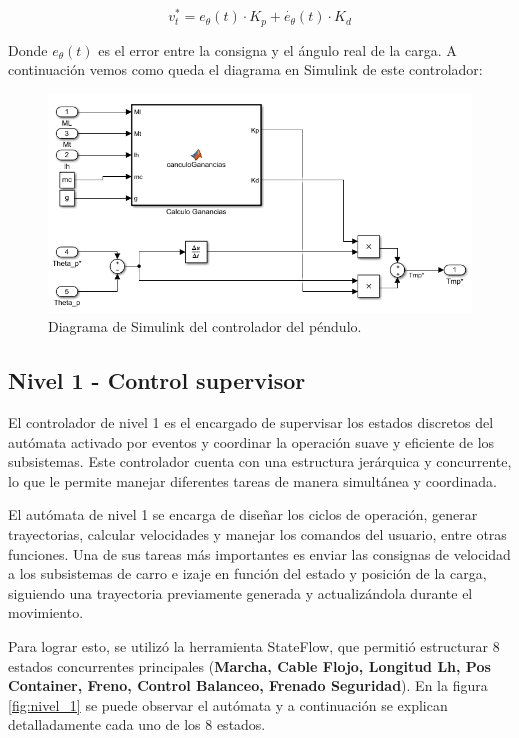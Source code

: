 \documentclass[11pt]{article}
\begin{document}
\begin{equation}
	\label{eq:velocidad_salida_controlador}
	v_t^{*}=e_\theta(t)\cdot K_p+\dot{e_{\theta}}(t)\cdot K_d
\end{equation}

Donde $e_\theta(t)$ es el error entre la consigna y el ángulo real de la carga. A continuación vemos como queda el diagrama en Simulink de este controlador:

\begin{figure}[h!]
	\centering
	\includegraphics[width=1\textwidth]{images/imagen_15_controlador_pendulo.png}
	\caption{Diagrama de Simulink del controlador del péndulo.}
	\label{fig:controlador_pendulo}
\end{figure}

\newpage

\subsection{Nivel 1 - Control supervisor}

El controlador de nivel 1 es el encargado de supervisar los estados discretos del autómata activado por eventos y coordinar la operación suave y eficiente de los subsistemas. Este controlador cuenta con una estructura jerárquica y concurrente, lo que le permite manejar diferentes tareas de manera simultánea y coordinada.

El autómata de nivel 1 se encarga de diseñar los ciclos de operación, generar trayectorias, calcular velocidades y manejar los comandos del usuario, entre otras funciones. Una de sus tareas más importantes es enviar las consignas de velocidad a los subsistemas de carro e izaje en función del estado y posición de la carga, siguiendo una trayectoria previamente generada y actualizándola durante el movimiento.

Para lograr esto, se utilizó la herramienta StateFlow, que permitió estructurar 8 estados concurrentes principales (\textbf{Marcha, Cable Flojo, Longitud Lh, Pos Container, Freno, Control Balanceo, Frenado Seguridad}). En la figura \ref{fig:nivel_1} se puede observar el autómata y a continuación se explican detalladamente cada uno de los 8 estados.
\end{document}
